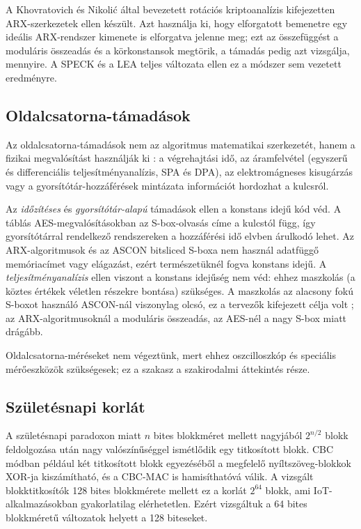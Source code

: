 \documentclass[a4paper,12pt]{report}
\theoremstyle{definition}
\theoremstyle{remark}
\begin{document}
A Khovratovich és Nikolić által bevezetett rotációs kriptoanalízis \cite{Khovratovich2010} kifejezetten ARX-szerkezetek ellen készült. Azt használja ki, hogy elforgatott bemenetre egy ideális ARX-rendszer kimenete is elforgatva jelenne meg; ezt az összefüggést a moduláris összeadás és a körkonstansok megtörik, a támadás pedig azt vizsgálja, mennyire. A SPECK és a LEA teljes változata ellen ez a módszer sem vezetett eredményre.

\subsection{Oldalcsatorna-támadások}

Az oldalcsatorna-támadások nem az algoritmus matematikai szerkezetét, hanem a fizikai megvalósítást használják ki \cite{Kocher1996}: a végrehajtási idő, az áramfelvétel (egyszerű és differenciális teljesítményanalízis, SPA és DPA), az elektromágneses kisugárzás vagy a gyorsítótár-hozzáférések mintázata információt hordozhat a kulcsról.

Az \emph{időzítéses} és \emph{gyorsítótár-alapú} támadások ellen a konstans idejű kód véd. A táblás AES-megvalósításokban az S-box-olvasás címe a kulcstól függ, így gyorsítótárral rendelkező rendszereken a hozzáférési idő elvben árulkodó lehet. Az ARX-algoritmusok és az ASCON bitsliced S-boxa nem használ adatfüggő memóriacímet vagy elágazást, ezért természetüknél fogva konstans idejű. A \emph{teljesítményanalízis} ellen viszont a konstans idejűség nem véd: ehhez maszkolás (a köztes értékek véletlen részekre bontása) szükséges. A maszkolás az alacsony fokú S-boxot használó ASCON-nál viszonylag olcsó, ez a tervezők kifejezett célja volt \cite{Dobraunig2021}; az ARX-algoritmusoknál a moduláris összeadás, az AES-nél a nagy S-box miatt drágább.

Oldalcsatorna-méréseket nem végeztünk, mert ehhez oszcilloszkóp és speciális mérőeszközök szükségesek; ez a szakasz a szakirodalmi áttekintés része.

\subsection{Születésnapi korlát}\label{sec:birthday}

A születésnapi paradoxon miatt $n$ bites blokkméret mellett nagyjából $2^{n/2}$ blokk feldolgozása után nagy valószínűséggel ismétlődik egy titkosított blokk. CBC módban például két titkosított blokk egyezéséből a megfelelő nyíltszöveg-blokkok XOR-ja kiszámítható, és a CBC-MAC is hamisíthatóvá válik. A vizsgált blokktitkosítók 128 bites blokkmérete mellett ez a korlát $2^{64}$ blokk, ami IoT-alkalmazásokban gyakorlatilag elérhetetlen. Ezért vizsgáltuk a 64 bites blokkméretű változatok helyett a 128 biteseket.
\end{document}
